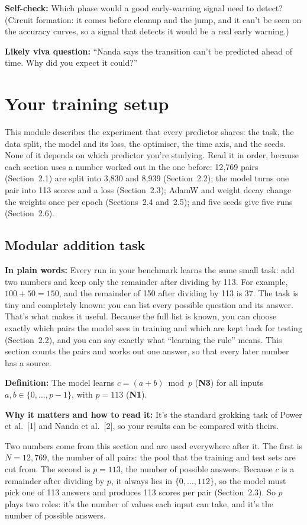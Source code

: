 \documentclass[11pt,a4paper,oneside,openany]{report}
\newcommand{\gl}[1]{\textbf{#1}}   %
\newcommand{\fplain}{\textbf{In plain words:} }
\newcommand{\fdef}{\textbf{Definition:} }
\newcommand{\fread}{\par\textbf{Why it matters and how to read it:} }
\newcommand{\fself}{\par\textbf{Self-check:} }
\newcommand{\fviva}{\par\textbf{Likely viva question:} }
\begin{document}
\fself Which phase would a good early-warning signal need to detect? (Circuit formation: it comes before cleanup and the jump, and it can't be seen on the accuracy curves, so a signal that detects it would be a real early warning.)
\fviva ``Nanda says the transition can't be predicted ahead of time. Why did you expect it could?''

\chapter{Your training setup}

This module describes the experiment that every predictor shares: the task, the data split, the model and its loss, the optimiser, the time axis, and the seeds. None of it depends on which predictor you're studying. Read it in order, because each section uses a number worked out in the one before: 12{,}769 pairs (Section~2.1) are split into 3{,}830 and 8{,}939 (Section~2.2); the model turns one pair into 113 scores and a loss (Section~2.3); AdamW and weight decay change the weights once per epoch (Sections~2.4 and~2.5); and five seeds give five runs (Section~2.6).

\section{Modular addition task}
\fplain Every run in your benchmark learns the same small task: add two numbers and keep only the remainder after dividing by 113. For example, $100 + 50 = 150$, and the remainder of 150 after dividing by 113 is 37. The task is tiny and completely known: you can list every possible question and its answer. That's what makes it useful. Because the full list is known, you can choose exactly which pairs the model sees in training and which are kept back for testing (Section~2.2), and you can say exactly what ``learning the rule'' means. This section counts the pairs and works out one answer, so that every later number has a source.

\fdef The model learns $c = (a + b) \bmod p$ (\gl{N3}) for all inputs $a, b \in \{0, \ldots, p-1\}$, with $p = 113$ (\gl{N1}).
\fread It's the standard grokking task of Power et al.\ [1] and Nanda et al.\ [2], so your results can be compared with theirs.

Two numbers come from this section and are used everywhere after it. The first is $N = 12{,}769$, the number of all pairs: the pool that the training and test sets are cut from. The second is $p = 113$, the number of possible answers. Because $c$ is a remainder after dividing by $p$, it always lies in $\{0, \ldots, 112\}$, so the model must pick one of 113 answers and produces 113 scores per pair (Section~2.3). So $p$ plays two roles: it's the number of values each input can take, and it's the number of possible answers.
\end{document}
